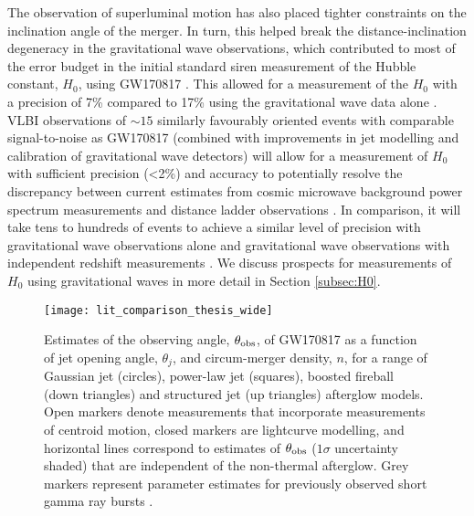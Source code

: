 The observation of superluminal motion has also placed tighter constraints on the inclination angle of the merger. In turn, this helped break the distance-inclination degeneracy \citep{1993PhRvD..47.2198F,2010ApJ...725..496N} in the gravitational wave observations, which contributed to most of the error budget in the initial standard siren measurement of the Hubble constant, $H_0$, using GW170817 \citep{2017Natur.551...85A}. This allowed for a measurement of the $H_0$ with a precision of 7\% \citep{2019NatAs...3..940H} compared to 17\% using the gravitational wave data alone \citep{2017Natur.551...85A}. VLBI observations of $\sim 15$ similarly favourably oriented events with comparable signal-to-noise as GW170817 (combined with improvements in jet modelling and calibration of gravitational wave detectors) will allow for a measurement of $H_0$ with sufficient precision (<2\%) and accuracy \citep{2019arXiv190908627M} to potentially resolve the discrepancy \citep{2019NatAs...3..891V} between current estimates from cosmic microwave background power spectrum measurements \citep{2018arXiv180706209P} and distance ladder observations \citep{2018ApJ...861..126R,2019ApJ...876...85R,2019ApJ...886L..27R}. In comparison, it will take tens to hundreds of events to achieve a similar level of precision with gravitational wave observations alone \citep{1986Natur.323..310S,2012PhRvD..86d3011D,2012PhRvL.108i1101M,2012PhRvD..85b3535T,2019ApJ...883L..42F} and gravitational wave observations with independent redshift measurements \citep{2006PhRvD..74f3006D,2010ApJ...725..496N,2013arXiv1307.2638N,2018Natur.562..545C,2018PhRvL.121b1303V,2019PhRvD.100j3523M,2019PhRvL.122f1105F,2019ApJ...876L...7S}. We discuss prospects for measurements of $H_0$ using gravitational waves in more detail in Section \ref{subsec:H0}.


\begin{landscape}
\begin{figure}
\centering
\texttt{[image: lit\_comparison\_thesis\_wide]}
\caption[Estimates of the parameters of the outflow produced by GW170817]{Estimates of the observing angle, $\theta_{\rm obs}$, of GW170817 as a function of jet opening angle, $\theta_j$, and circum-merger density, $n$, for a range of Gaussian jet (circles), power-law jet (squares), boosted fireball (down triangles) and structured jet (up triangles) afterglow models. Open markers denote measurements that incorporate measurements of centroid motion, closed markers are lightcurve modelling, and horizontal lines correspond to estimates of $\theta_{\rm obs}$ ($1\sigma$ uncertainty shaded) that are independent of the non-thermal afterglow. Grey markers represent parameter estimates for previously observed short gamma ray bursts \citep{2019ApJ...880L..23W}.}
\label{fig:lit_comparison}
\end{figure}
\end{landscape}

